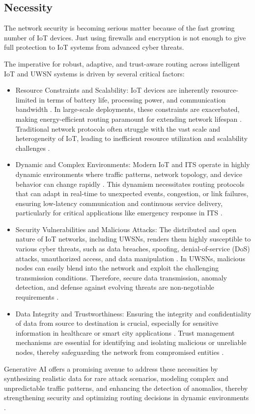 \documentclass[a4paper,fleqn]{cas-dc}
\numberwithin{equation}{section}
\begin{document}
\subsection{Necessity}
The network security is becoming serious matter because of the fast growing number of IoT devices. Just using firewalls and encryption is not enough to give full protection to IoT systems from advanced cyber threats. 

The imperative for robust, adaptive, and trust-aware routing across intelligent IoT and UWSN systems is driven by several critical factors: 
\begin{itemize} 
\item Resource Constraints and Scalability: IoT devices are inherently resource-limited in terms of battery life, processing power, and communication bandwidth \cite{Abujassar2025}. In large-scale deployments, these constraints are exacerbated, making energy-efficient routing paramount for extending network lifespan \cite{Fu2024}. Traditional network protocols often struggle with the vast scale and heterogeneity of IoT, leading to inefficient resource utilization and scalability challenges \cite{Li2025}. 
\item Dynamic and Complex Environments: Modern IoT and ITS operate in highly dynamic environments where traffic patterns, network topology, and device behavior can change rapidly \cite{song2025emergency}. This dynamism necessitates routing protocols that can adapt in real-time to unexpected events, congestion, or link failures, ensuring low-latency communication and continuous service delivery, particularly for critical applications like emergency response in ITS \cite{Byakodi2023}. 
\item Security Vulnerabilities and Malicious Attacks: The distributed and open nature of IoT networks, including UWSNs, renders them highly susceptible to various cyber threats, such as data breaches, spoofing, denial-of-service (DoS) attacks, unauthorized access, and data manipulation \cite{Saadouni20248655}. In UWSNs, malicious nodes can easily blend into the network and exploit the challenging transmission conditions. Therefore, secure data transmission, anomaly detection, and defense against evolving threats are non-negotiable requirements . 
\item Data Integrity and Trustworthiness: Ensuring the integrity and confidentiality of data from source to destination is crucial, especially for sensitive information in healthcare or smart city applications \cite{Anantula20255162}. Trust management mechanisms are essential for identifying and isolating malicious or unreliable nodes, thereby safeguarding the network from compromised entities \cite{wang2024gtr}. 
\end{itemize} 
Generative AI offers a promising avenue to address these necessities by synthesizing realistic data for rare attack scenarios, modeling complex and unpredictable traffic patterns, and enhancing the detection of anomalies, thereby strengthening security and optimizing routing decisions in dynamic environments \cite{devi2024robust}.
\end{document}
